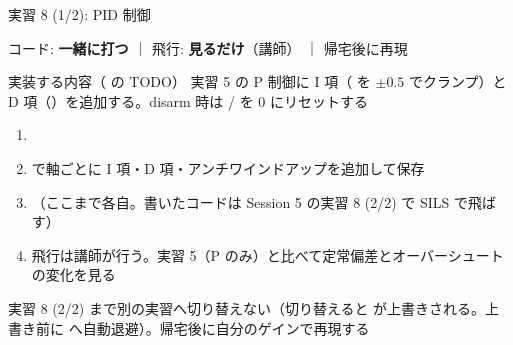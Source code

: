 \begin{frame}[fragile]{実習 8 (1/2): PID 制御}
  \vspace{0.15em}

  {\footnotesize コード: \textcolor{sfblue}{\textbf{一緒に打つ}} ｜ 飛行: \textcolor{sfblue}{\textbf{見るだけ}}（講師） ｜ 帰宅後に再現}

  \vspace{0.3em}

  \begin{block}{実装する内容（ の TODO）}\footnotesize
    実習 5 の P 制御に I 項（ を $\pm0.5$ でクランプ）と
    D 項（）を追加する。disarm 時は
    / を 0 にリセットする
  \end{block}

  \begin{enumerate}\footnotesize\setlength{\itemsep}{0pt}
    \item {}
    \item {} で軸ごとに I 項・D 項・アンチワインドアップを追加して保存
    \item {}（ここまで各自。書いたコードは Session 5 の実習 8 (2/2) で SILS で飛ばす）
    \item 飛行は講師が行う。実習 5（P のみ）と比べて定常偏差とオーバーシュートの変化を見る
  \end{enumerate}

  {\footnotesize 実習 8 (2/2) まで別の実習へ切り替えない（切り替えると  が上書きされる。上書き前に  へ自動退避）。帰宅後に自分のゲインで再現する}
\end{frame}

